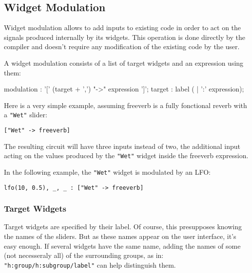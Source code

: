 
\subsection{Widget Modulation}

Widget modulation allows to add inputs to existing code in order to act on the signals produced internally by its widgets. This operation is done directly by the compiler and doesn't require any modification of the existing code by the user.

A widget modulation consists of a list of target widgets and an expression using them:

\begin{rail}
	modulation : '[' (target + ',') "->" expression ']';
	target : label ( | ':' expression);
\end{rail}
	

Here is a very simple example, assuming freeverb is a fully fonctional reverb with a \lstinline'"Wet"' slider:

\begin{lstlisting}
["Wet" -> freeverb]
\end{lstlisting}

The resulting circuit will have three inputs instead of two, the additional input acting on the values produced by the \lstinline'"Wet"' widget inside the freeverb expression.

In the following example, the  \lstinline'"Wet"' widget is modulated by an LFO:

\begin{lstlisting}
lfo(10, 0.5), _, _ : ["Wet" -> freeverb]
\end{lstlisting}

\subsubsection{Target Widgets}

Target widgets are specified by their label. Of course, this presupposes knowing the names of the sliders. But as these names appear on the user interface, it's easy enough. If several widgets have the same name, adding the names of some (not necesseraly all) of the surrounding groups, as in: \lstinline`"h:group/h:subgroup/label"` can help distinguish them. 

